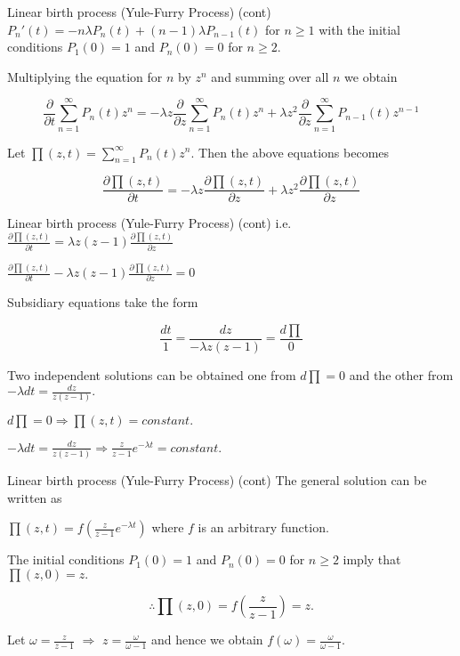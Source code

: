\documentclass[12pt,ignorenonframetext,]{beamer}
\begin{document}
\begin{frame}{Linear birth process (Yule-Furry Process) (cont)}
\protect\hypertarget{linear-birth-process-yule-furry-process-cont}{}
\(P_n'(t) = -n\lambda P_n(t) + (n-1) \lambda P_{n-1}(t)\) for
\(n \geq 1\) with the initial conditions \(P_1(0)=1\) and \(P_n(0) = 0\)
for \(n \geq 2\).

Multiplying the equation for \(n\) by \(z^n\) and summing over all \(n\)
we obtain

\[\frac{\partial}{\partial t}\sum_{n=1}^{\infty}P_n(t)z^n=-\lambda z \frac{\partial}{ \partial z} \sum_{n=1}^{\infty}P_n(t) z^n + \lambda z^2 \frac{\partial}{\partial z} \sum_{n=1}^{\infty}P_{n-1}(t)z^{n-1}\]

Let \(\prod(z, t) = \sum_{n=1}^{\infty}P_n(t)z^n\). Then the above
equations becomes

\[\frac{\partial \prod (z, t)}{\partial t}=-\lambda z \frac{\partial \prod (z, t)}{\partial z} + \lambda z^2 \frac{\partial \prod (z, t)}{\partial z}\]
\end{frame}

\begin{frame}{Linear birth process (Yule-Furry Process) (cont)}
\protect\hypertarget{linear-birth-process-yule-furry-process-cont-1}{}
i.e.~\(\frac{\partial \prod (z, t)}{\partial t} = \lambda z (z-1) \frac{\partial \prod (z, t)}{\partial z}\)

\(\frac{\partial \prod (z, t)}{\partial t} - \lambda z (z-1) \frac{\partial \prod (z, t)}{\partial z} =0\)

Subsidiary equations take the form

\[\frac{dt}{1} = \frac{dz}{-\lambda z (z-1)} = \frac{d\prod}{0} \]

Two independent solutions can be obtained one from \(d \prod = 0\) and
the other from \(-\lambda dt = \frac{dz}{z(z-1)}.\)

\(d \prod =0 \Rightarrow \prod(z, t) = constant.\)

\(-\lambda dt = \frac{dz}{z(z-1)} \Rightarrow \frac{z}{z-1}e^{-\lambda t} = constant.\)
\end{frame}

\begin{frame}{Linear birth process (Yule-Furry Process) (cont)}
\protect\hypertarget{linear-birth-process-yule-furry-process-cont-2}{}
The general solution can be written as

\(\prod (z, t) = f\left(\frac{z}{z-1}e^{-\lambda t}\right)\) where \(f\)
is an arbitrary function.

The initial conditions \(P_1(0) =1\) and \(P_n(0)=0\) for \(n \geq 2\)
imply that \(\prod (z, 0) = z.\)

\[  \therefore \prod (z, 0) = f \left (\frac{z}{z-1} \right) = z.\]

Let \(\omega = \frac{z}{z-1}\) \(\Rightarrow\)
\(z= \frac{\omega}{\omega - 1}\) and hence we obtain
\(f(\omega) = \frac{\omega}{\omega -1 }\).
\end{frame}
\end{document}
